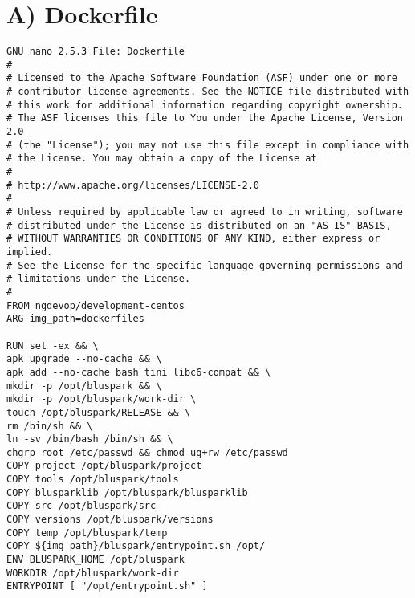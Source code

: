 
\appendix
{}


\chapter*{A) Dockerfile}
\begin{lstlisting}
GNU nano 2.5.3 File: Dockerfile
#
# Licensed to the Apache Software Foundation (ASF) under one or more
# contributor license agreements. See the NOTICE file distributed with
# this work for additional information regarding copyright ownership.
# The ASF licenses this file to You under the Apache License, Version 2.0
# (the "License"); you may not use this file except in compliance with
# the License. You may obtain a copy of the License at
#
# http://www.apache.org/licenses/LICENSE-2.0
#
# Unless required by applicable law or agreed to in writing, software
# distributed under the License is distributed on an "AS IS" BASIS,
# WITHOUT WARRANTIES OR CONDITIONS OF ANY KIND, either express or implied.
# See the License for the specific language governing permissions and
# limitations under the License.
#
FROM ngdevop/development-centos
ARG img_path=dockerfiles

RUN set -ex && \
apk upgrade --no-cache && \
apk add --no-cache bash tini libc6-compat && \
mkdir -p /opt/bluspark && \
mkdir -p /opt/bluspark/work-dir \
touch /opt/bluspark/RELEASE && \
rm /bin/sh && \
ln -sv /bin/bash /bin/sh && \
chgrp root /etc/passwd && chmod ug+rw /etc/passwd
COPY project /opt/bluspark/project
COPY tools /opt/bluspark/tools
COPY blusparklib /opt/bluspark/blusparklib
COPY src /opt/bluspark/src
COPY versions /opt/bluspark/versions
COPY temp /opt/bluspark/temp
COPY ${img_path}/bluspark/entrypoint.sh /opt/
ENV BLUSPARK_HOME /opt/bluspark
WORKDIR /opt/bluspark/work-dir
ENTRYPOINT [ "/opt/entrypoint.sh" ]
\end{lstlisting}